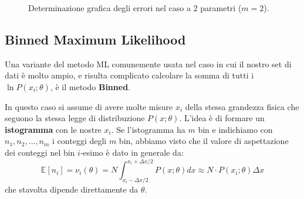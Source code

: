 \documentclass[openany,a4paper,12pt]{book}
\theoremstyle{remark}
\begin{document}
\begin{figure}[H]
\centering
{}
\caption{Determinazione grafica degli errori nel caso a 2 parametri ($m=2$).}
\end{figure}

\subsection{Binned Maximum Likelihood}
Una variante del metodo ML comunemente usata nel caso in cui il nostro set di dati è molto ampio, e risulta complicato calcolare la somma di tutti i $\ln P(x_i; \theta)$, è il metodo \textbf{Binned}.

In questo caso si assume di avere molte misure $x_i$ della stessa grandezza fisica che seguono la stessa legge di distribuzione $P(x; \theta)$. L'idea è di formare un \textbf{istogramma} con le nostre $x_i$. 
Se l'istogramma ha $m$ bin e indichiamo con $n_1, n_2, \dots, n_m$ i conteggi degli $m$ bin, abbiamo visto che il valore di aspettazione dei conteggi nel bin $i$-esimo è dato in generale da:
\begin{equation}
    \mathbb{E}[n_i] = \nu_i(\theta) = N \int_{x_i - \Delta x/2}^{x_i + \Delta x/2} P(x; \theta) dx \approx N \cdot P(x_i; \theta) \Delta x
    \label{eq_E}
\end{equation} 
che stavolta dipende direttamente da $\theta$.
\end{document}
